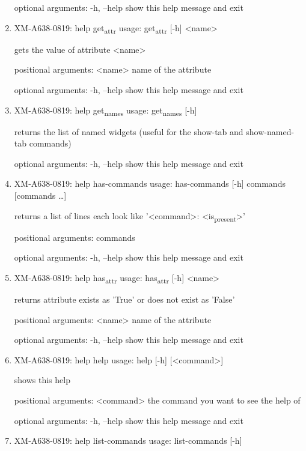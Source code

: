 \documentclass[11pt]{article}
\begin{document}
\begin{enumerate}
optional arguments:
  -h, --help  show this help message and exit

\item XM-A638-0819: help get\textsubscript{attr}
\label{sec:org2b7c6bc}
usage: get\textsubscript{attr} [-h] <name>

gets the value of attribute <name>

positional arguments:
  <name>      name of the attribute

optional arguments:
  -h, --help  show this help message and exit

\item XM-A638-0819: help get\textsubscript{names}
\label{sec:orgee9a674}
usage: get\textsubscript{names} [-h]

returns the list of named widgets (useful for the show-tab and show-named-tab
commands)

optional arguments:
  -h, --help  show this help message and exit

\item XM-A638-0819: help has-commands
\label{sec:org19f74a5}
usage: has-commands [-h] commands [commands \ldots{}]

returns a list of lines each look like '<command>: <is\textsubscript{present}>'

positional arguments:
  commands

optional arguments:
  -h, --help  show this help message and exit

\item XM-A638-0819: help has\textsubscript{attr}
\label{sec:org321dbb1}
usage: has\textsubscript{attr} [-h] <name>

returns attribute exists as 'True' or does not exist as 'False'

positional arguments:
  <name>      name of the attribute

optional arguments:
  -h, --help  show this help message and exit

\item XM-A638-0819: help help
\label{sec:orgcef9b6e}
usage: help [-h] [<command>]

shows this help

positional arguments:
  <command>   the command you want to see the help of

optional arguments:
  -h, --help  show this help message and exit

\item XM-A638-0819: help list-commands
\label{sec:org1db049e}
usage: list-commands [-h]


\end{enumerate}
\end{document}
